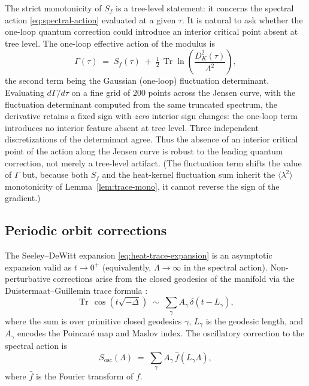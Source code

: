 \documentclass[12pt]{article}
\theoremstyle{definition}
\theoremstyle{remark}
\DeclareMathOperator{\Tr}{Tr}
\begin{document}
The strict monotonicity of $S_f$ is a tree-level statement: it concerns
the spectral action \eqref{eq:spectral-action} evaluated at a given
$\tau$.  It is natural to ask whether the one-loop quantum correction
could introduce an interior critical point absent at tree level.  The
one-loop effective action of the modulus is
\begin{equation}\label{eq:effective-action}
  \Gamma(\tau) \;=\; S_f(\tau) \;+\; \tfrac{1}{2}\,
  \Tr \ln\!\left(\frac{D_K^2(\tau)}{\Lambda^2}\right),
\end{equation}
the second term being the Gaussian (one-loop) fluctuation determinant.
Evaluating $d\Gamma/d\tau$ on a fine grid of $200$ points across the
Jensen curve, with the fluctuation determinant computed from the same
truncated spectrum, the derivative retains a fixed sign with
\emph{zero} interior sign changes: the one-loop term introduces no
interior feature absent at tree level.  Three independent
discretizations of the determinant agree.  Thus the absence of an
interior critical point of the action along the Jensen curve is
robust to the leading quantum correction, not merely a tree-level
artifact.  (The fluctuation term shifts the value of $\Gamma$ but,
because both $S_f$ and the heat-kernel fluctuation sum inherit the
$\langle\lambda^2\rangle$ monotonicity of Lemma~\ref{lem:trace-mono},
it cannot reverse the sign of the gradient.)


\subsection{Periodic orbit corrections}

The Seeley--DeWitt expansion \eqref{eq:heat-trace-expansion} is an
asymptotic expansion valid as $t \to 0^+$ (equivalently,
$\Lambda \to \infty$ in the spectral action).  Non-perturbative
corrections arise from the closed geodesics of the manifold via the
Duistermaat--Guillemin trace formula
\cite{DuistermaatGuillemin1975}:
\begin{equation}\label{eq:DG-formula}
  \Tr\, \cos(t\sqrt{-\Delta}) \;\sim\;
  \sum_{\gamma} A_\gamma\, \delta(t - L_\gamma),
\end{equation}
where the sum is over primitive closed geodesics $\gamma$, $L_\gamma$
is the geodesic length, and $A_\gamma$ encodes the Poincar\'e map
and Maslov index.  The oscillatory correction to the spectral action
is
\begin{equation}\label{eq:osc-correction}
  S_{\mathrm{osc}}(\Lambda) \;=\; \sum_\gamma A_\gamma\,
  \hat{f}(L_\gamma \Lambda),
\end{equation}
where $\hat{f}$ is the Fourier transform of $f$.
\end{document}
